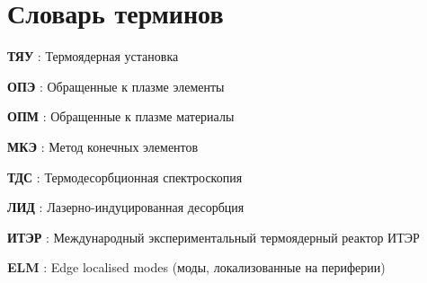 \chapter*{Словарь терминов}             %

\textbf{ТЯУ} : Термоядерная установка

\textbf{ОПЭ} : Обращенные к плазме элементы

\textbf{ОПМ} : Обращенные к плазме материалы

\textbf{МКЭ} : Метод конечных элементов

\textbf{ТДС} : Термодесорбционная спектроскопия

\textbf{ЛИД} : Лазерно-индуцированная десорбция

\textbf{ИТЭР} : Международный экспериментальный термоядерный реактор ИТЭР

\textbf{ELM} : Edge localised modes (моды, локализованные на периферии)
